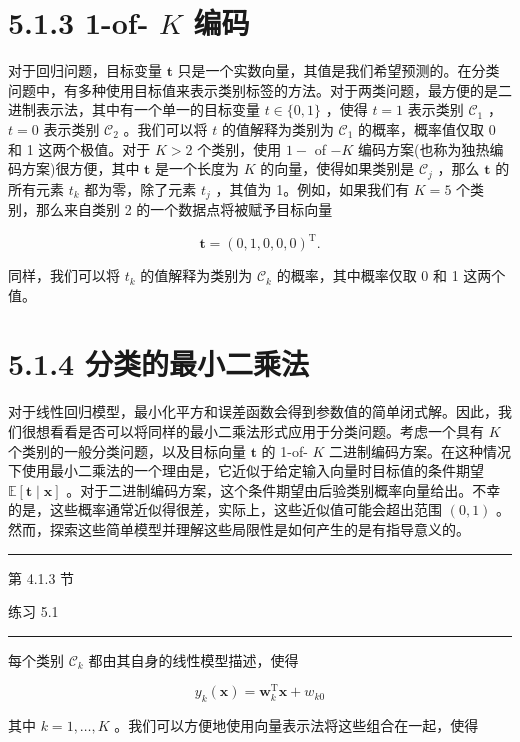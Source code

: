 \documentclass[10pt]{article}
\newcommand{\HRule}{\begin{center}\rule{0.9\linewidth}{0.2mm}\end{center}}
\begin{document}
\section*{5.1.3 1-of- \(K\) 编码}

对于回归问题，目标变量 \(\mathbf{t}\) 只是一个实数向量，其值是我们希望预测的。在分类问题中，有多种使用目标值来表示类别标签的方法。对于两类问题，最方便的是二进制表示法，其中有一个单一的目标变量 \(t \in  \{ 0,1\}\) ，使得 \(t = 1\) 表示类别 \({\mathcal{C}}_{1}\) ， \(t = 0\) 表示类别 \({\mathcal{C}}_{2}\) 。我们可以将 \(t\) 的值解释为类别为 \({\mathcal{C}}_{1}\) 的概率，概率值仅取 0 和 1 这两个极值。对于 \(K > 2\) 个类别，使用 \(1 -\) of \(- K\) 编码方案(也称为独热编码方案)很方便，其中 \(\mathbf{t}\) 是一个长度为 \(K\) 的向量，使得如果类别是 \({\mathcal{C}}_{j}\) ，那么 \(\mathbf{t}\) 的所有元素 \({t}_{k}\) 都为零，除了元素 \({t}_{j}\) ，其值为 1。例如，如果我们有 \(K = 5\) 个类别，那么来自类别 2 的一个数据点将被赋予目标向量

\[
\mathbf{t} = {\left( 0,1,0,0,0\right) }^{\mathrm{T}}. \tag{5.11}
\]

同样，我们可以将 \({t}_{k}\) 的值解释为类别为 \({\mathcal{C}}_{k}\) 的概率，其中概率仅取 0 和 1 这两个值。

\section*{5.1.4 分类的最小二乘法}

对于线性回归模型，最小化平方和误差函数会得到参数值的简单闭式解。因此，我们很想看看是否可以将同样的最小二乘法形式应用于分类问题。考虑一个具有 \(K\) 个类别的一般分类问题，以及目标向量 \(\mathbf{t}\) 的 1-of- \(K\) 二进制编码方案。在这种情况下使用最小二乘法的一个理由是，它近似于给定输入向量时目标值的条件期望 \(\mathbb{E}\left\lbrack  {\mathbf{t} \mid  \mathbf{x}}\right\rbrack\) 。对于二进制编码方案，这个条件期望由后验类别概率向量给出。不幸的是，这些概率通常近似得很差，实际上，这些近似值可能会超出范围 \(\left( {0,1}\right)\) 。然而，探索这些简单模型并理解这些局限性是如何产生的是有指导意义的。

\HRule

第 4.1.3 节

练习 5.1

\HRule

每个类别 \({\mathcal{C}}_{k}\) 都由其自身的线性模型描述，使得

\[
{y}_{k}\left( \mathbf{x}\right)  = {\mathbf{w}}_{k}^{\mathrm{T}}\mathbf{x} + {w}_{k0} \tag{5.12}
\]

其中 \(k = 1,\ldots ,K\) 。我们可以方便地使用向量表示法将这些组合在一起，使得
\end{document}
